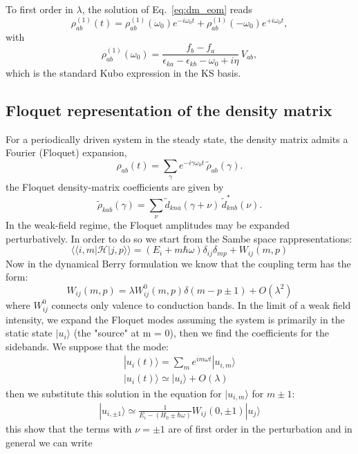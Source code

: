 \documentclass[aps,physrev,preprint,groupedaddress]{revtex4-2}
\newcommand{\bea}{\begin{eqnarray}}
\newcommand{\eea}{\end{eqnarray}}
\renewcommand{\[}{\left[}
\renewcommand{\]}{\right]}
\renewcommand{\(}{\left(}
\renewcommand{\)}{\right)}
\begin{document}
To first order in $\lambda$, the solution of Eq.~\eqref{eq:dm_eom} reads
\begin{equation}
\rho^{(1)}_{ab}(t)
=
\rho^{(1)}_{ab}(\omega_0)e^{-i\omega_0 t}
+
\rho^{(1)}_{ab}(-\omega_0)e^{+i\omega_0 t},
\end{equation}
with
\begin{equation}
\rho^{(1)}_{ab}(\omega_0)
=
\frac{f_b - f_a}
{\epsilon_{ka}-\epsilon_{kb}-\omega_0+i\eta}
\,V_{ab},
\label{eq:kubo_dm}
\end{equation}
which is the standard Kubo expression in the KS basis.

\subsection{Floquet representation of the density matrix}

For a periodically driven system in the steady state, the density matrix admits a Fourier
(Floquet) expansion,
\begin{equation}
\rho_{ab}(t)
=
\sum_{\gamma} e^{-i\gamma\omega_0 t}\,
\tilde\rho_{ab}(\gamma).
\label{eq:floquet_dm}
\end{equation}
the Floquet density-matrix coefficients are given by
\begin{equation}
\tilde\rho_{kab}(\gamma)
=
\sum_{\nu}
\tilde d_{kna}(\gamma+\nu)\,
\tilde d^{*}_{knb}(\nu).
\label{eq:floquet_dm_coeff}
\end{equation}
In the weak-field regime, the Floquet amplitudes may be expanded perturbatively. In order
to do so we start from the Sambe space rappresentations: 
\begin{equation}
	\langle\langle i, m | \mathcal{H} | j, p  \rangle\rangle = (E_i + m\hbar\omega) \delta_{ij} \delta_{mp} + W_{ij}(m,p)
\end{equation}
Now in the dynamical Berry formulation we know that the coupling term has the form:
\begin{equation}
	W_{ij}(m,p) = \lambda W^0_{ij}(m,p)\delta(m-p\pm 1) + O(\lambda^2)
\end{equation}
where $W^0_{ij}$ connects only valence to conduction bands.
In the limit of a weak field intensity, we expand the Floquet modes assuming the system is primarily in the static state $|u_{i}\rangle$ (the "source" at m = 0), then we find the coefficients for the sidebands.
We suppose that the mode:
\bea
	|u_i(t) \rangle = \sum_m e^{im\omega t} | u_{i,m} \rangle\\
	|u_i(t) \rangle \simeq  |u_{i} \rangle + O(\lambda)
\eea
then we substitute this solution in the equation for $|u_{i,m} \rangle$ for $m \pm 1$:
\bea
 |u_{i,\pm 1} \rangle \simeq  \frac{1}{E_i - (H_0 \pm \hbar\omega)} W_{ij} (0,\pm 1) | u_j \rangle
\eea
this show that the terms with $\nu=\pm 1$ are of first order in the perturbation and in general we can write
\end{document}
